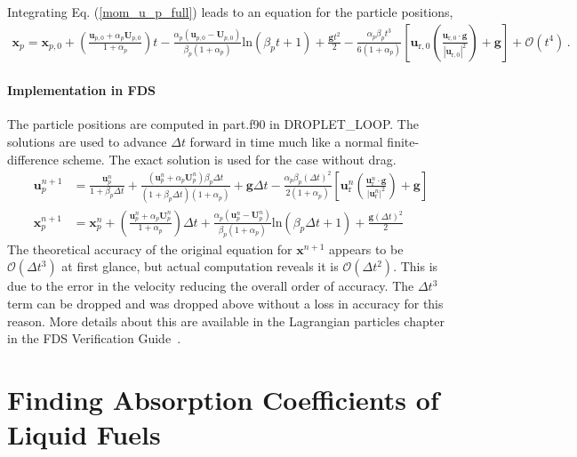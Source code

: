 Integrating Eq. (\ref{mom_u_p_full}) leads to an equation for the particle positions,
\begin{align}
    \label{mom_x_p_full}
    \mathbf{x}_p = \mathbf{x}_{p,0} + \left(\frac{\mathbf{u}_{p,0} + \alpha_p \mathbf{U}_{p,0}}{1 + \alpha_p}\right) t - \frac{\alpha_p (\mathbf{u}_{p,0} - \mathbf{U}_{p,0})}{\beta_p (1 + \alpha_p)} \text{ln}(\beta_p t + 1) + \frac{\mathbf{g} t^2}{2} - \frac{\alpha_p \beta_p t^3}{6 (1 + \alpha_p)} \left[\mathbf{u}_{\text{r},0} \left(\frac{\mathbf{u}_{\text{r},0} \cdot \mathbf{g}}{|\mathbf{u}_{\text{r},0}|^2}\right) + \mathbf{g}\right] + \mathcal{O}(t^4) \,.
\end{align}
\subsubsection{Implementation in FDS}
The particle positions are computed in {\ct part.f90} in {\ct DROPLET\_LOOP}. The solutions are used to advance $\Delta t$ forward in time much like a normal finite-difference scheme. The exact solution is used for the case without drag.
\begin{align}
    \mathbf{u}_p^{n+1} &= \frac{\mathbf{u}_p^n}{1 + \beta_p \Delta t} + \frac{(\mathbf{u}_p^n + \alpha_p \mathbf{U}_p^n)\beta_p \Delta t}{(1 + \beta_p \Delta t)(1 + \alpha_p)} + \mathbf{g} \Delta t - \frac{\alpha_p \beta_p (\Delta t)^2}{2 (1 + \alpha_p)} \left[\mathbf{u}_\text{r}^n \left(\frac{\mathbf{u}_\text{r}^n \cdot \mathbf{g}}{|\mathbf{u}_\text{r}^n|^2}\right) + \mathbf{g}\right] \\[1cm]
    \mathbf{x}_p^{n+1} &= \mathbf{x}_p^n + \left(\frac{\mathbf{u}_p^n + \alpha_p \mathbf{U}_p^n}{1 + \alpha_p}\right) \Delta t + \frac{\alpha_p (\mathbf{u}_p^n - \mathbf{U}_p^n)}{\beta_p (1 + \alpha_p)} \text{ln}(\beta_p \Delta t + 1) + \frac{\mathbf{g} (\Delta t)^2}{2}
\end{align}
The theoretical accuracy of the original equation for $\mathbf{x}^{n+1}$ appears to be $\mathcal{O}(\Delta t^3)$ at first glance, but actual computation reveals it is $\mathcal{O}(\Delta t^2)$. This is due to the error in the velocity reducing the overall order of accuracy. The $\Delta t^3$ term can be dropped and was dropped above without a loss in accuracy for this reason. More details about this are available in the Lagrangian particles chapter in the FDS Verification Guide~\cite{FDS_Verification_Guide}.

\chapter{Finding Absorption Coefficients of Liquid Fuels}
\label{app_abscoeff}

